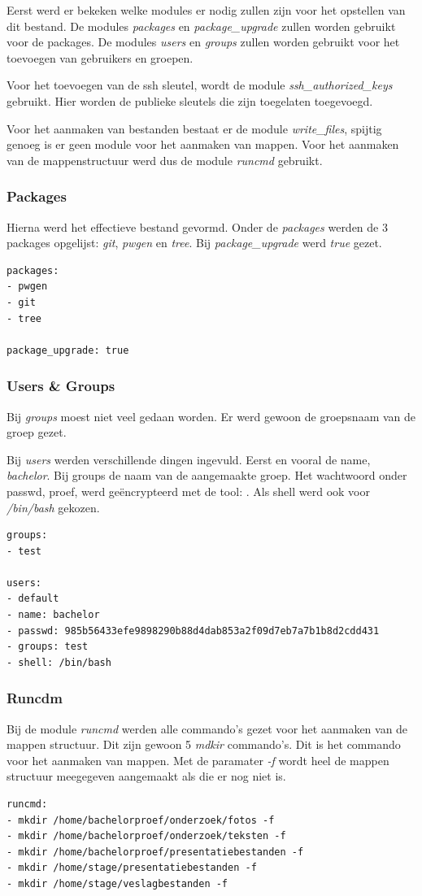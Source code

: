Eerst werd er bekeken welke modules er nodig zullen zijn voor het opstellen van dit bestand. De modules \textit{packages} en \textit{package\_upgrade} zullen worden gebruikt voor de packages. De modules \textit{users} en \textit{groups} zullen worden gebruikt voor het toevoegen van gebruikers en groepen. 

Voor het toevoegen van de ssh sleutel, wordt de module \textit{ssh\_authorized\_keys} gebruikt. Hier worden de publieke sleutels die zijn toegelaten toegevoegd.

Voor het aanmaken van bestanden bestaat er de module \textit{write\_files}, spijtig genoeg is er geen module voor het aanmaken van mappen. Voor het aanmaken van de mappenstructuur werd dus de module \textit{runcmd} gebruikt.

\subsubsection{Packages}
Hierna werd het effectieve bestand gevormd. Onder de \textit{packages} werden de 3 packages opgelijst: \textit{git}, \textit{pwgen} en \textit{tree}. Bij \textit{package\_upgrade} werd \textit{true} gezet. 
\begin{lstlisting}[basicstyle=\small]
packages:
- pwgen
- git
- tree

package_upgrade: true
\end{lstlisting}

\subsubsection{Users \& Groups}
Bij \textit{groups} moest niet veel gedaan worden. Er werd gewoon de groepsnaam van de groep gezet.

Bij \textit{users} werden verschillende dingen ingevuld. Eerst en vooral de name, \textit{bachelor}. Bij groups de naam van de aangemaakte groep. Het wachtwoord onder passwd, proef, werd geëncrypteerd met de tool: \autocite{toolmkpass}. Als shell werd ook voor \textit{/bin/bash} gekozen.
\begin{lstlisting}[basicstyle=\small]
groups:
- test

users:
- default
- name: bachelor
- passwd: 985b56433efe9898290b88d4dab853a2f09d7eb7a7b1b8d2cdd431
- groups: test
- shell: /bin/bash
\end{lstlisting}


\subsubsection{Runcdm}
Bij de module \textit{runcmd} werden alle commando's gezet voor het aanmaken van de mappen structuur. Dit zijn gewoon 5 \textit{mdkir} commando's. Dit is het commando voor het aanmaken van mappen. Met de paramater \textit{-f} wordt heel de mappen structuur meegegeven aangemaakt als die er nog niet is.
\begin{lstlisting}[basicstyle=\small]
runcmd:
- mkdir /home/bachelorproef/onderzoek/fotos -f
- mkdir /home/bachelorproef/onderzoek/teksten -f
- mkdir /home/bachelorproef/presentatiebestanden -f
- mkdir /home/stage/presentatiebestanden -f
- mkdir /home/stage/veslagbestanden -f
\end{lstlisting}

